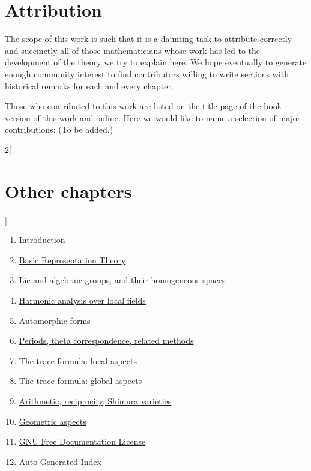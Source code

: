 \documentclass{stacks-project-book}
\theoremstyle{plain}
\theoremstyle{definition}
\theoremstyle{remark}
\numberwithin{equation}{subsection}
\begin{document}
\section{Attribution}
\label{introduction-section-attribution}

\noindent
The scope of this work is such that it is a daunting task to attribute
correctly and succinctly all of those mathematicians whose work has led
to the development of the theory we try to explain here. We hope eventually
to generate enough community interest to find contributors willing to write
sections with historical remarks for each and every chapter.

\medskip\noindent
Those who contributed to this work are listed on the title page of the book
version of this work and
\href{http://automorphic.newark.rutgers.edu/tex/CONTRIBUTORS}{online}.
Here we would like to name a selection of major contributions:
(To be added.)



\begin{multicols}{2}[\section{Other chapters}]
\noindent
\begin{enumerate}
\item \hyperref[introduction-section-phantom]{Introduction}
\item \hyperref[representationtheory-section-phantom]{Basic Representation Theory}
\item \hyperref[algebraicgroups-section-phantom]{Lie and algebraic groups, and their homogeneous spaces}
\item \hyperref[harmonicanalysis-section-phantom]{Harmonic analysis over local fields}
\item \hyperref[automorphicforms-section-phantom]{Automorphic forms}
\item \hyperref[periods-section-phantom]{Periods, theta correspondence, related methods}
\item \hyperref[traceformulalocal-section-phantom]{The trace formula: local aspects}
\item \hyperref[traceformulaglobal-section-phantom]{The trace formula: global aspects}
\item \hyperref[arithmetic-section-phantom]{Arithmetic, reciprocity, Shimura varieties}
\item \hyperref[geometric-section-phantom]{Geometric aspects}
\item \hyperref[fdl-section-phantom]{GNU Free Documentation License}
\item \hyperref[index-section-phantom]{Auto Generated Index}
\end{enumerate}
\end{multicols}
\end{document}
